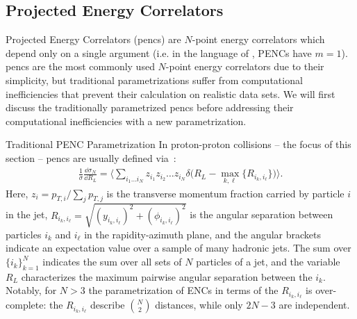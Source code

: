 

\subsection{Projected Energy Correlators}
\label{sec:enc-projected}

Projected Energy Correlators (\glspl{penc}) are $N$-point energy correlators which depend only on a single argument (i.e. in the language of , PENCs have \(m=1\)).
%
\glspl{penc} are the most commonly used $N$-point energy correlators due to their simplicity, but traditional parametrizations suffer from computational inefficiencies that prevent their calculation on realistic data sets.
%
We will first discuss the traditionally parametrized \glspl{penc} before addressing their computational inefficiencies with a new parametrization.

\begin{definitionbox}{Traditional PENC Parametrization}{}
    In proton-proton collisions -- the focus of this section -- \glspl{penc} are usually defined via~\cite{Chen:2020vvp}:
    \begin{align}
        \label{eq:old_def}
        \frac{1}{\sigma}\frac{\dd \sigma_N}{\dd R_L}
       \! =\!
        \biggl\langle
            \sum_{i_1 \dots i_N}
            z_{i_1} z_{i_2} \dots z_{i_N}
            \delta\big(
                R_L
                \!-\!
                \max_{k,\ell}
                \{R_{i_k,i_\ell}\}
            \big)
       \!\! \biggr\rangle.
    \end{align}
    Here, $z_{i}= p_{T,i}/\sum_j p_{T,j}$ is the transverse momentum fraction carried by particle $i$ in the jet, $R_{i_k,i_\ell} = \sqrt{(y_{i_k,i_\ell})^2 + (\phi_{i_k,i_\ell})^2}$
    is the angular separation between particles $i_k$ and $i_\ell$ in the rapidity-azimuth plane, and the angular brackets indicate an expectation value over a sample of many hadronic jets.
    The sum over $\{i_k\}_{k=1}^N$ indicates the sum over all sets of $N$ particles of a jet, and the variable \(R_L\) characterizes the maximum pairwise angular separation between the \(i_k\).
    Notably, for $N>3$ the parametrization of ENCs in terms of the $R_{i_k,i_\ell}$ is over-complete:
    the $R_{i_k,i_\ell}$ describe $N \choose 2$ distances, while only $2N-3$ are independent.
\end{definitionbox}

